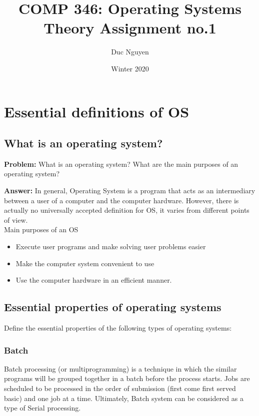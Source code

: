 \documentclass[a4paper]{article}
\title{COMP 346: Operating Systems \\
 Theory Assignment no.1}
\author{Duc Nguyen}
\affil{Gina Cody School of Computer Science and Software Engineering \\
    Concordia University, Montreal, QC, Canada}
\date{Winter 2020}
\begin{document}
\begin{titlepage}
\maketitle
\end{titlepage}

\newpage
\tableofcontents
\newpage

\section{Essential definitions of OS}
\subsection{What is an operating system?}

\textbf{Problem:}
What is an operating system? What are the main purposes of an operating system?

\textbf{Answer:}
In general, Operating System is a program that acts as an intermediary between a user of a computer and the computer hardware. However, there is actually no universally accepted definition for OS, it varies from different points of view.
\\
Main purposes of an OS
\begin{itemize}
    \item Execute user programs and make solving user problems easier
    \item Make the computer system convenient to use
    \item Use the computer hardware in an efficient manner.
\end{itemize}

\subsection{Essential properties of operating systems}
Define the essential properties of the following types of operating systems:
\subsubsection{Batch}
Batch processing (or multiprogramming) is a technique in which the similar programs will be grouped together in a batch before the process starts. Jobs are scheduled to be processed in the order of submission (first come first served basic) and one job at a time. Ultimately, Batch system can be considered as a type of Serial processing.
\end{document}
